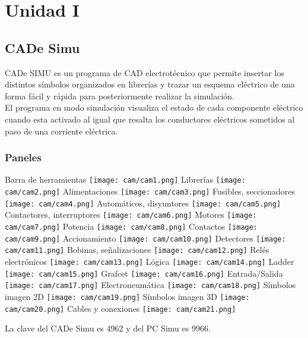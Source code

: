 \documentclass[
	12pt, %
	fleqn, %
	a4paper, %
	oneside, %
]{LegrandOrangeBook}
\begin{document}
\chapter{Unidad I}
\section{CADe Simu}
CADe SIMU es un programa de CAD electrotécnico que permite insertar los distintos símbolos organizados en librerías y trazar un esquema eléctrico de una forma fácil y rápida para posteriormente realizar la simulación.\\
El programa en modo simulación visualiza el estado de cada componente eléctrico cuando esta activado al igual que resalta los conductores eléctricos sometidos al paso de una corriente eléctrica.
\subsection{Paneles}
\begin{center}
Barra de herramientas
\texttt{[image: cam/cam1.png]}
Librerías
\texttt{[image: cam/cam2.png]}
Alimentaciones
\texttt{[image: cam/cam3.png]}
Fusibles, seccionadores
\texttt{[image: cam/cam4.png]}
Automáticos, disyuntores
\texttt{[image: cam/cam5.png]}
Contactores, interruptores
\texttt{[image: cam/cam6.png]}
Motores
\texttt{[image: cam/cam7.png]}
Potencia
\texttt{[image: cam/cam8.png]}
Contactos
\texttt{[image: cam/cam9.png]}
Accionamiento
\texttt{[image: cam/cam10.png]}
Detectores
\texttt{[image: cam/cam11.png]}
Bobinas, señalizaciones
\texttt{[image: cam/cam12.png]}
Relés electrónicos
\texttt{[image: cam/cam13.png]}
Lógica
\texttt{[image: cam/cam14.png]}
Ladder
\texttt{[image: cam/cam15.png]}
Grafcet
\texttt{[image: cam/cam16.png]}
Entrada/Salida
\texttt{[image: cam/cam17.png]}
Electroneumática
\texttt{[image: cam/cam18.png]}
Símbolos imagen 2D
\texttt{[image: cam/cam19.png]}
Símbolos imagen 3D
\texttt{[image: cam/cam20.png]}
Cables y conexiones
\texttt{[image: cam/cam21.png]}
\end{center}
\begin{notation}
La clave del CADe Simu es 4962 y del PC Simu es 9966.
\end{notation}
\end{document}
